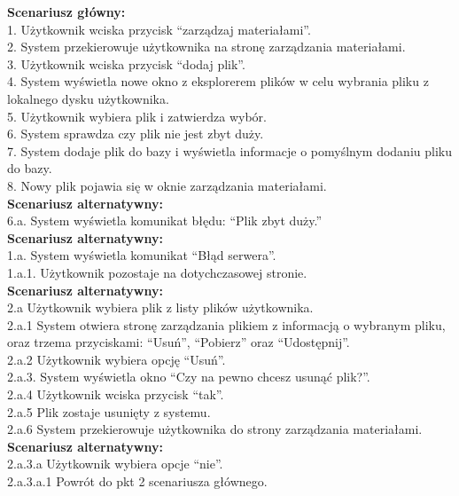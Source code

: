 \begin{enumerate}[label=(\Roman*)]
\textbf{Scenariusz główny:}\\
1. Użytkownik wciska przycisk “zarządzaj materiałami”.\\
2. System przekierowuje użytkownika na stronę zarządzania materiałami.\\
3. Użytkownik wciska przycisk “dodaj plik”.\\
4. System wyświetla nowe okno z eksplorerem plików w celu wybrania pliku z
lokalnego dysku użytkownika.\\
5. Użytkownik wybiera plik i zatwierdza wybór.\\
6. System sprawdza czy plik nie jest zbyt duży.\\
7. System dodaje plik do bazy i wyświetla informacje o pomyślnym dodaniu pliku do
bazy.\\
8. Nowy plik pojawia się w oknie zarządzania materiałami.\\
\textbf{Scenariusz alternatywny:}\\
6.a. System wyświetla komunikat błędu: “Plik zbyt duży.”\\
\textbf{Scenariusz alternatywny:}\\
1.a. System wyświetla komunikat “Błąd serwera”.\\
1.a.1. Użytkownik pozostaje na dotychczasowej stronie.\\
\textbf{Scenariusz alternatywny:}\\
2.a Użytkownik wybiera plik z listy plików użytkownika.\\
2.a.1 System otwiera stronę zarządzania plikiem z informacją o wybranym pliku, oraz trzema
przyciskami: “Usuń”, “Pobierz” oraz “Udostępnij”.\\
2.a.2 Użytkownik wybiera opcję “Usuń”.\\
2.a.3. System wyświetla okno “Czy na pewno chcesz usunąć plik?”.\\
2.a.4 Użytkownik wciska przycisk “tak”.\\
2.a.5 Plik zostaje usunięty z systemu.\\
2.a.6 System przekierowuje użytkownika do strony zarządzania materiałami.\\
\textbf{Scenariusz alternatywny:}\\
2.a.3.a Użytkownik wybiera opcje “nie”.\\
2.a.3.a.1 Powrót do pkt 2 scenariusza głównego.\\


\end{enumerate}
